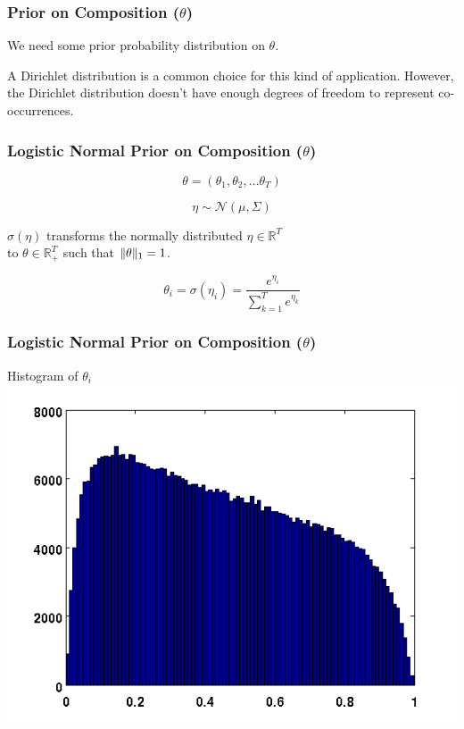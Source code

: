 \begin{frame}
  \frametitle{Prior on Composition ($\theta$)}
  \begin{center}
    We need some prior probability distribution on $\theta$.
    \vspace{0.3in}

    A Dirichlet distribution is a common choice for this kind of application.
    However, the Dirichlet distribution doesn't have enough degrees of freedom to represent co-occurrences.
  \end{center}
\end{frame}

\begin{frame}
  \frametitle{Logistic Normal Prior on Composition ($\theta$)}
  \begin{center}
    \begin{equation*}
      \theta = ( \theta_1, \theta_2, \dots \theta_T )
    \end{equation*}

    \begin{equation*}
      \eta \sim \mathcal{N}(\mu, \Sigma)
    \end{equation*}

    $\sigma(\eta)$ transforms the normally distributed $\eta \in \mathbb{R}^T$ \\
    to $\theta \in \mathbb{R}_+^T$ such that $\lVert\theta\rVert_1 = 1$.

    \begin{equation*}
      \theta_i = \sigma(\eta_i) = \frac{e^{\eta_i}}{\sum_{k=1}^{T}e^{\eta_k}}
    \end{equation*}
  \end{center}
\end{frame}

\begin{frame}
  \frametitle{Logistic Normal Prior on Composition ($\theta$)}
  \begin{center}
    Histogram of $\theta_i$
    \includegraphics[scale=0.6]{img/log-normal-figs/hist-1.png}
  \end{center}
\end{frame}

